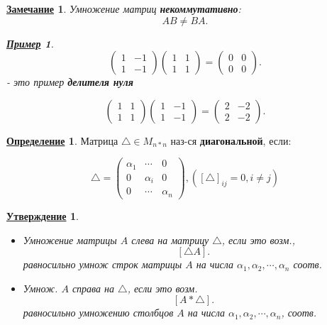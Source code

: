 \documentclass[12pt]{article}
\newtheorem{statement}{\underline{Утверждение}}[section]
\newtheorem*{note}{\underline{Замечание}}
\newtheorem*{example}{\underline{Пример}}
\theoremstyle{definition}
\newtheorem{definition}{\underline{Определение}}[section]
\theoremstyle{definition}
\begin{document}
\begin{note}
Умножение матриц \textbf{некоммутативно}:
\[
AB \neq BA
.\] 
\begin{example}
\[
    \begin{pmatrix} 1 & -1 \\ 1 & -1 \end{pmatrix}
    \begin{pmatrix} 1 & 1 \\ 1 & 1 \end{pmatrix} =
    \begin{pmatrix} 0 & 0 \\ 0 & 0 \end{pmatrix}
.\] 
- это пример \textbf{делителя нуля}

\[
    \begin{pmatrix} 1 & 1 \\ 1 & 1 \end{pmatrix}
    \begin{pmatrix} 1 & -1 \\ 1 & -1 \end{pmatrix} = 
    \begin{pmatrix} 2 & -2 \\ 2 & -2 \end{pmatrix}
.\] 
\end{example}

\end{note}

\begin{definition}
Матрица $\triangle \in M_{n * n}$ наз-ся \textbf{диагональной}, если:

\[
    \triangle = \begin{pmatrix} \alpha_1 & \cdots & 0 \\
    0 & \alpha_i & 0 \\
0 & \cdots & \alpha_n\end{pmatrix}, ([\triangle]_{ij} = 0, i \neq j) 
\]
\end{definition}

\begin{statement}
    ~\newline
    
\begin{itemize}
    \item[a) ] Умножение матрицы $A$ слева на матрицу $\triangle$, если это возм.,
        \[
        [\triangle A]
        .\]
        равносильно умнож строк матрицы $A$ на числа $\alpha_1, \alpha_2, \cdots, \alpha_n$ соотв.
    \item[b) ] Умнож. $A$ справа на $\triangle$, если это возм.
        \[
        [A * \triangle ]
        .\] 
        равносильно умножению столбцов $A$ на числа $\alpha_1, \alpha_2, \cdots, \alpha_n$, соотв. 
\end{itemize}
\end{statement}
\end{document}
